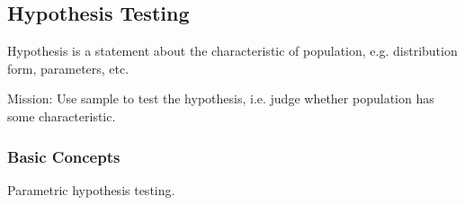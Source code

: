 \subsection{Hypothesis Testing}\label{SectionHypothesisTesting}
    Hypothesis is a statement about the characteristic of population, e.g. distribution form, parameters, etc. 
    
    Mission: Use sample to test the hypothesis, i.e. judge whether population has some characteristic.

\subsubsection{Basic Concepts}\label{SubSectionHypothesisTestingBasicConcepts}
    Parametric hypothesis testing.

